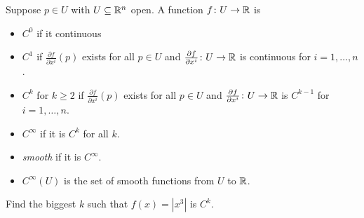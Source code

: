 \begin{frame}

  \begin{definition}
    Suppose $p \in U$ with $U \subseteq \mathbb R^n$
    open. 
    A function $f \colon U \to \mathbb R$ is
    \begin{itemize}
      \item $C^0$ if it continuous
      \item $C^1$ if $\frac{\partial f}{\partial x^i}(p)$ exists for all 
        $p \in U$ and $\frac{\partial f}{\partial x^i} \colon U \to \mathbb R$ is 
        continuous for $i = 1, \dots, n$.
      \item $C^k$ for $k \ge 2$ if $\frac{\partial f}{\partial x^i}(p)$ exists for all 
        $p \in U$ and $\frac{\partial f}{\partial x^i} \colon U \to \mathbb R$ is 
        $C^{k-1}$ for $i = 1, \dots, n$.
      \item $C^\infty$ if it is $C^k$ for all $k$.
      \item {\em smooth} if it is $C^\infty$.
      \item $C^\infty(U)$ is the set of smooth functions from $U$ to $\mathbb R$.
    \end{itemize}
    \begin{exercise}
      Find the biggest $k$ such that $f(x) = |x^3|$ is $C^k$.
    \end{exercise}
  \end{definition}
  

\end{frame}


